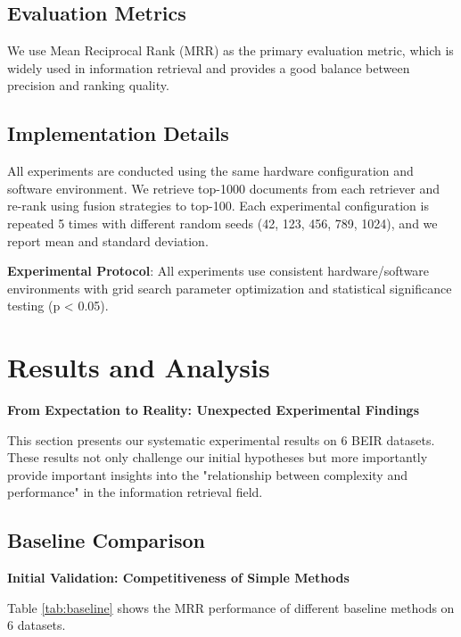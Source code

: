 \documentclass[letterpaper]{article} %
\begin{document}
\subsection{Evaluation Metrics}

We use Mean Reciprocal Rank (MRR) as the primary evaluation metric, which is widely used in information retrieval and provides a good balance between precision and ranking quality.

\subsection{Implementation Details}

All experiments are conducted using the same hardware configuration and software environment. We retrieve top-1000 documents from each retriever and re-rank using fusion strategies to top-100. Each experimental configuration is repeated 5 times with different random seeds (42, 123, 456, 789, 1024), and we report mean and standard deviation.

\textbf{Experimental Protocol}: All experiments use consistent hardware/software environments with grid search parameter optimization and statistical significance testing (p < 0.05).

\section{Results and Analysis}

\textbf{From Expectation to Reality: Unexpected Experimental Findings}

This section presents our systematic experimental results on 6 BEIR datasets. These results not only challenge our initial hypotheses but more importantly provide important insights into the "relationship between complexity and performance" in the information retrieval field.

\subsection{Baseline Comparison}

\textbf{Initial Validation: Competitiveness of Simple Methods}

Table \ref{tab:baseline} shows the MRR performance of different baseline methods on 6 datasets.
\end{document}
